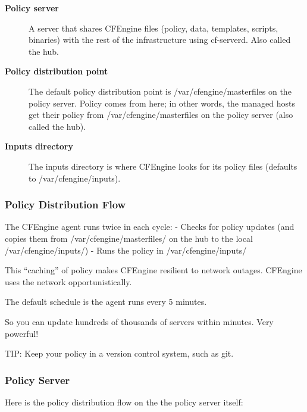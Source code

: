 \begin{description}
\item[\textbf{Policy server}] A server that shares CFEngine files (policy, data, templates, scripts, binaries) with the rest of the infrastructure using cf-serverd. Also called the hub.



\item[\textbf{Policy distribution point}] The default policy distribution point is /var/cfengine/masterfiles on the policy server. Policy comes from here; in other words, the managed hosts get their policy from /var/cfengine/masterfiles on the policy server (also called the hub).



\item[\textbf{Inputs directory}] The inputs directory is where CFEngine looks for its policy files (defaults to /var/cfengine/inputs).
\end{description}





\subsubsection{Policy Distribution Flow}

The CFEngine agent runs twice in each cycle:
- Checks for policy updates (and copies them from /var/cfengine/masterfiles/ on the hub to the local /var/cfengine/inputs/)
- Runs the policy in /var/cfengine/inputs/

This ``caching'' of policy makes CFEngine resilient to network outages. CFEngine uses the network opportunistically.

The default schedule is the agent runs every 5 minutes.

So you can update hundreds of thousands of servers within minutes. Very powerful!





TIP: Keep your policy in a version control system, such as git.





\subsubsection{Policy Server}

Here is the policy distribution flow on the the policy server itself:

